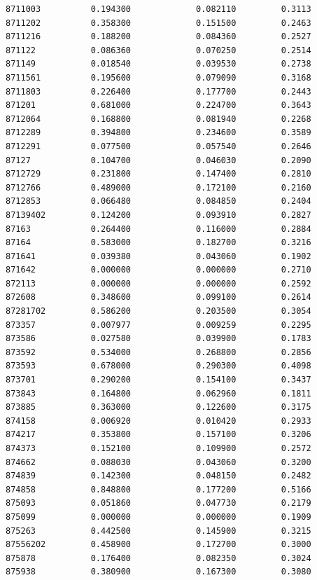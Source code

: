 \documentclass[
  letterpaper,
  DIV=11,
  numbers=noendperiod]{scrartcl}
\begin{document}
\begin{verbatim}
8711003          0.194300             0.082110         0.3113
8711202          0.358300             0.151500         0.2463
8711216          0.188200             0.084360         0.2527
871122           0.086360             0.070250         0.2514
871149           0.018540             0.039530         0.2738
8711561          0.195600             0.079090         0.3168
8711803          0.226400             0.177700         0.2443
871201           0.681000             0.224700         0.3643
8712064          0.168800             0.081940         0.2268
8712289          0.394800             0.234600         0.3589
8712291          0.077500             0.057540         0.2646
87127            0.104700             0.046030         0.2090
8712729          0.231800             0.147400         0.2810
8712766          0.489000             0.172100         0.2160
8712853          0.066480             0.084850         0.2404
87139402         0.124200             0.093910         0.2827
87163            0.264400             0.116000         0.2884
87164            0.583000             0.182700         0.3216
871641           0.039380             0.043060         0.1902
871642           0.000000             0.000000         0.2710
872113           0.000000             0.000000         0.2592
872608           0.348600             0.099100         0.2614
87281702         0.586200             0.203500         0.3054
873357           0.007977             0.009259         0.2295
873586           0.027580             0.039900         0.1783
873592           0.534000             0.268800         0.2856
873593           0.678000             0.290300         0.4098
873701           0.290200             0.154100         0.3437
873843           0.164800             0.062960         0.1811
873885           0.363000             0.122600         0.3175
874158           0.006920             0.010420         0.2933
874217           0.353800             0.157100         0.3206
874373           0.152100             0.109900         0.2572
874662           0.088030             0.043060         0.3200
874839           0.142300             0.048150         0.2482
874858           0.848800             0.177200         0.5166
875093           0.051860             0.047730         0.2179
875099           0.000000             0.000000         0.1909
875263           0.442500             0.145900         0.3215
87556202         0.458900             0.172700         0.3000
875878           0.176400             0.082350         0.3024
875938           0.380900             0.167300         0.3080

\end{verbatim}
\end{document}
